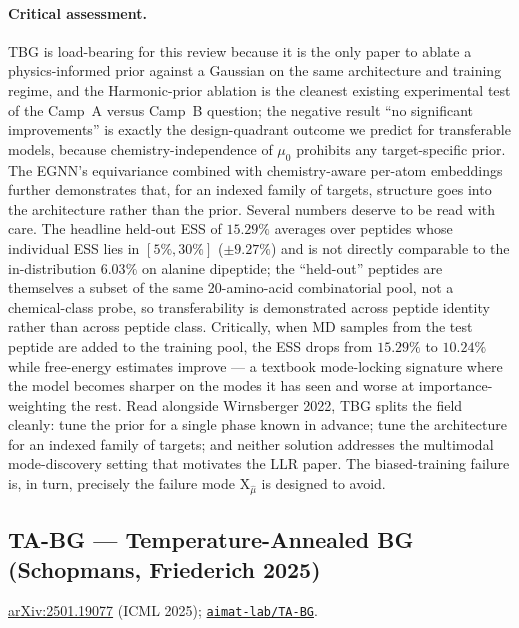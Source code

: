 \documentclass[11pt,letterpaper]{article}
\newcommand{\Xfun}{\mathrm{X}}
\theoremstyle{plain}
\begin{document}
\paragraph{Critical assessment.} TBG is load-bearing for this review because
it is the only paper to ablate a physics-informed prior against a Gaussian on
the same architecture and training regime, and the Harmonic-prior ablation is
the cleanest existing experimental test of the Camp~A versus Camp~B question;
the negative result ``no significant improvements'' is exactly the
design-quadrant outcome we predict for transferable models, because
chemistry-independence of $\mu_0$ prohibits any target-specific prior. The
EGNN's equivariance combined with chemistry-aware per-atom embeddings further
demonstrates that, for an indexed family of targets, structure goes into the
architecture rather than the prior. Several numbers deserve to be read with
care. The headline held-out ESS of $15.29\%$ averages over peptides whose
individual ESS lies in $[5\%, 30\%]$ ($\pm 9.27\%$) and is not directly
comparable to the in-distribution $6.03\%$ on alanine dipeptide; the
``held-out'' peptides are themselves a subset of the same 20-amino-acid
combinatorial pool, not a chemical-class probe, so transferability is
demonstrated across peptide identity rather than across peptide class.
Critically, when MD samples from the test peptide are added to the training
pool, the ESS drops from $15.29\%$ to $10.24\%$ while free-energy estimates
improve --- a textbook mode-locking signature where the model becomes sharper
on the modes it has seen and worse at importance-weighting the rest. Read
alongside Wirnsberger 2022, TBG splits the field cleanly: tune the prior for
a single phase known in advance; tune the architecture for an indexed family
of targets; and neither solution addresses the multimodal mode-discovery
setting that motivates the LLR paper. The biased-training failure is, in
turn, precisely the failure mode $\Xfun_{\hat\mu}$ is designed to avoid.

\subsection{TA-BG --- Temperature-Annealed BG (Schopmans, Friederich 2025)}

\href{https://arxiv.org/abs/2501.19077}{arXiv:2501.19077} (ICML 2025);
\href{https://github.com/aimat-lab/TA-BG}{\texttt{aimat-lab/TA-BG}}.
\end{document}
